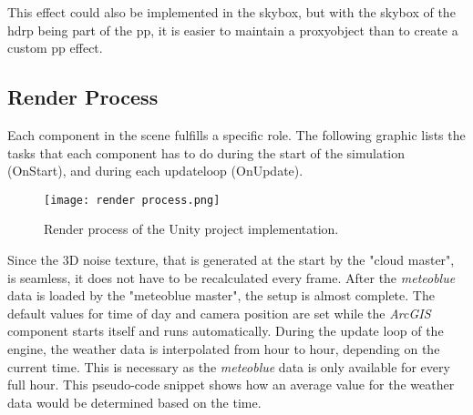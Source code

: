 \begin{figure}[H]
    \centering
    \label{img:techimpl:skyproxy}
\end{figure}

\noindent
This effect could also be implemented in the skybox, but with the skybox of the \gls{hdrp} being part of the \gls{pp}, it is easier to maintain a \gls{proxyobject} than to create a custom \gls{pp} effect.

\clearpage

\subsection{Render Process}
\label{section:techimpl:process}
Each component in the scene fulfills a specific role. The following graphic lists the tasks that each component has to do during the start of the simulation (OnStart), and during each \gls{updateloop} (OnUpdate).

\begin{figure}[H]
    \texttt{[image: render process.png]}
    \caption{Render process of the Unity project implementation.}
\end{figure}

\noindent
Since the 3D \gls{noise} texture, that is generated at the start by the "cloud master", is seamless, it does not have to be recalculated every frame.
After the \emph{meteoblue} data is loaded by the "meteoblue master", the setup is almost complete.
The default values for time of day and camera position are set while the \emph{ArcGIS} component starts itself and runs automatically.
\emptyline
During the update loop of the engine, the weather data is interpolated from hour to hour, depending on the current time.
This is necessary as the \emph{meteoblue} data is only available for every full hour.
This pseudo-code snippet shows how an average value for the weather data would be determined based on the time.

